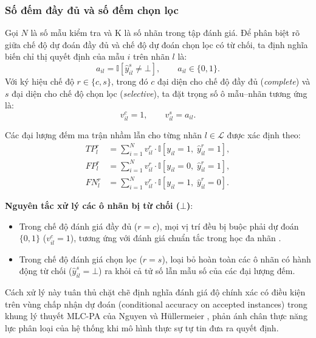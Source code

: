 \documentclass[11pt,a4paper]{article}
\begin{document}
\subsubsection{Số đếm đầy đủ và số đếm chọn lọc}
Gọi $N$ là số mẫu kiểm tra và K là số nhãn trong tập đánh giá. Để phân biệt rõ giữa chế độ dự đoán đầy đủ và chế độ dự đoán chọn lọc có từ chối, ta định nghĩa biến chỉ thị quyết định của mẫu $i$ trên nhãn $l$ là:
\begin{equation}
a_{il} = \mathbb I\left[\hat y^s_{il} \ne \bot\right], \qquad a_{il} \in \{0, 1\}.
\label{eq:decision-mask}
\end{equation}
Với ký hiệu chế độ $r \in \{c, s\}$, trong đó $c$ đại diện cho chế độ đầy đủ (\emph{complete}) và $s$ đại diện cho chế độ chọn lọc (\emph{selective}), ta đặt trọng số ô mẫu--nhãn tương ứng là:
\begin{equation}
v^c_{il} = 1, \qquad v^s_{il} = a_{il}.
\end{equation}

Các đại lượng đếm ma trận nhầm lẫn cho từng nhãn $l \in \mathcal L$ được xác định theo:
\begin{align}
TP_l^r &= \sum_{i=1}^N v^r_{il} \cdot \mathbb I\left[y_{il}=1, \; \hat y^r_{il}=1\right], \nonumber \\
FP_l^r &= \sum_{i=1}^N v^r_{il} \cdot \mathbb I\left[y_{il}=0, \; \hat y^r_{il}=1\right], \label{eq:counts} \\
FN_l^r &= \sum_{i=1}^N v^r_{il} \cdot \mathbb I\left[y_{il}=1, \; \hat y^r_{il}=0\right]. \nonumber
\end{align}

\noindent\textbf{Nguyên tắc xử lý các ô nhãn bị từ chối ($\bot$)}:
\begin{itemize}
  \item Trong chế độ đánh giá đầy đủ ($r=c$), mọi vị trí đều bị buộc phải dự đoán $\{0, 1\}$ ($v_{il}^c = 1$), tương ứng với đánh giá chuẩn tắc trong học đa nhãn \cite{zhang2014}.
  \item Trong chế độ đánh giá chọn lọc ($r=s$), loại bỏ hoàn toàn các ô nhãn có hành động từ chối ($\hat y_{il}^s = \bot$) ra khỏi cả tử số lẫn mẫu số của các đại lượng đếm.
\end{itemize}

Cách xử lý này tuân thủ chặt chẽ định nghĩa đánh giá độ chính xác có điều kiện trên vùng chấp nhận dự đoán (conditional accuracy on accepted instances) trong khung lý thuyết MLC-PA của Nguyen và Hüllermeier \cite{nguyen2021}, phản ánh chân thực năng lực phân loại của hệ thống khi mô hình thực sự tự tin đưa ra quyết định.
\end{document}
